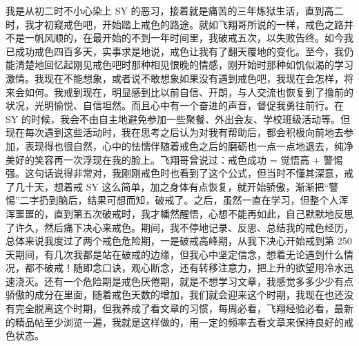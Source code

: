 \begin{case}
    我是从初二时不小心染上 SY 的恶习，接着就是痛苦的三年炼狱生活，直到高二时，我才初窥戒色吧，开始踏上戒色的路途。就如飞翔哥所说的一样，戒色之路并不是一帆风顺的，在最开始的不到一年时间里，我破戒五次，以失败告终。如今我已成功戒色四百多天，实事求是地说，戒色让我有了翻天覆地的变化。至今，我仍能清楚地回忆起刚见戒色吧时那种相见恨晚的情感，刚开始时那种如饥似渴的学习激情。我现在不能想象，或者说不敢想象如果没有遇到戒色吧，我现在会怎样，将来会如何。我戒到现在，明显感到比以前自信、开朗，与人交流也恢复到了撸前的状况，光明愉悦、自信坦然。而且心中有一个奋进的声音，督促我勇往前行。在 SY 的时候，我会不由自主地避免参加一些聚餐、外出会友、学校班级活动等。但现在每次遇到这些活动时，我在思考之后认为对我有帮助后，都会积极向前地去参加，表现得也很自然，心中的怯懦伴随着戒色之后的磨砺也一点一点地退去，纯净美好的笑容再一次浮现在我的脸上。飞翔哥曾说过：戒色成功 = 觉悟高 + 警惕强。这句话说得非常对，我刚刚戒色时也看到了这个公式，但当时不懂其深意，戒了几十天，想着戒 SY 这么简单，加之身体有点恢复，就开始骄傲，渐渐把“警惕”二字扔到脑后，结果可想而知，破戒了。之后，虽然一直在学习，但整个人浑浑噩噩的，直到第五次破戒时，我才幡然醒悟，心想不能再如此，自己默默地反思了许久，然后痛下决心来戒色。期间，我不停地记录、反思、总结我的戒色经历，总体来说我度过了两个戒色危险期，一是破戒高峰期，从我下决心开始戒到第 250 天期间，有几次我都是站在破戒的边缘，但我心中坚定信念，想着无论遇到什么情况，都不破戒！随即念口诀，观心断念，还有转移注意力，把上升的欲望用冷水迅速浇灭。还有一个危险期是戒色厌倦期，就是不想学习文章，我感觉多多少少有点骄傲的成分在里面，随着戒色天数的增加，我们就会迎来这个时期，我现在也还没有完全脱离这个时期，但我养成了看文章的习惯，每周必看，飞翔经验必看，最新的精品帖至少浏览一遍，我就是这样做的，用一定的频率去看文章来保持良好的戒色状态。


\end{case}

